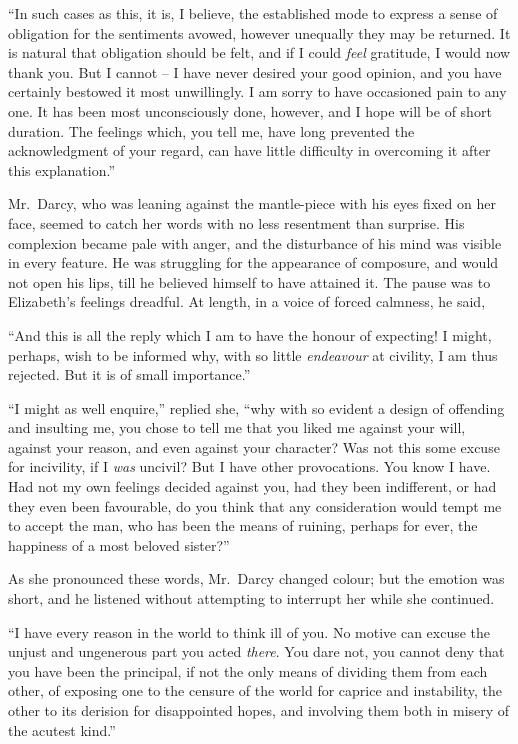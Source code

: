 “In such cases as this, it is, I believe, the established
mode to express a sense of obligation for the sentiments
avowed, however unequally they may be returned. It is
natural that obligation should be felt, and if I could \textit{feel}
gratitude, I would now thank you. But I cannot -- I have
never desired your good opinion, and you have certainly
bestowed it most unwillingly. I am sorry to have occasioned
pain to any one. It has been most unconsciously
done, however, and I hope will be of short duration.
The feelings which, you tell me, have long prevented the
acknowledgment of your regard, can have little difficulty
in overcoming it after this explanation.”

Mr.\ Darcy, who was leaning against the mantle-piece
with his eyes fixed on her face, seemed to catch her words
with no less resentment than surprise. His complexion
became pale with anger, and the disturbance of his mind
was visible in every feature. He was struggling for the
appearance of composure, and would not open his lips,
till he believed himself to have attained it. The pause
was to Elizabeth’s feelings dreadful. At length, in a voice
of forced calmness, he said,

“And this is all the reply which I am to have the
honour of expecting! I might, perhaps, wish to be informed
why, with so little \textit{endeavour} at civility, I am thus
rejected. But it is of small importance.”

“I might as well enquire,” replied she, “why with so
evident a design of offending and insulting me, you chose
to tell me that you liked me against your will, against
your reason, and even against your character? Was not
this some excuse for incivility, if I \textit{was} uncivil? But I have
other provocations. You know I have. Had not my own
feelings decided against you, had they been indifferent,
or had they even been favourable, do you think that any
consideration would tempt me to accept the man, who has
been the means of ruining, perhaps for ever, the happiness
of a most beloved sister?”

As she pronounced these words, Mr.\ Darcy changed
colour; but the emotion was short, and he listened
without attempting to interrupt her while she continued.

“I have every reason in the world to think ill of you.
No motive can excuse the unjust and ungenerous part
you acted \textit{there}. You dare not, you cannot deny that you
have been the principal, if not the only means of dividing
them from each other, of exposing one to the censure of
the world for caprice and instability, the other to its
derision for disappointed hopes, and involving them both
in misery of the acutest kind.”

